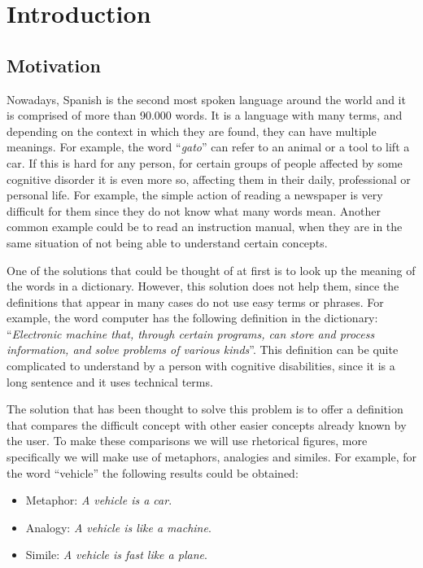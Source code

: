 \chapter{Introduction}
\label{cap:introduction}

\section{Motivation}
\label{sec:motivation}

Nowadays, Spanish is the second most spoken language around the world and it is comprised of more than 90.000 words. It is a language with many terms, and depending on the context in which they are found, they can have multiple meanings. For example, the word ``\textit{gato}'' can refer to an animal or a tool to lift a car. If this is hard for any person, for certain groups of people affected by some cognitive disorder it is even more so, affecting them in their daily, professional or personal life. For example, the simple action of reading a newspaper is very difficult for them since they do not know what many words mean. Another common example could be to read an instruction manual, when they are in the same situation of not being able to understand certain concepts.


One of the solutions that could be thought of at first is to look up the meaning of the words in a dictionary. However, this solution does not help them, since the definitions that appear in many cases do not use easy terms or phrases. For example, the word computer has the following definition in the dictionary: ``\textit{Electronic machine that, through certain programs, can store and process information, and solve problems of various kinds}''. This definition can be quite complicated to understand by a person with cognitive disabilities, since it is a long sentence and it uses technical terms.


The solution that has been thought to solve this problem is to offer a definition that compares the difficult concept with other easier concepts already known by the user. To make these comparisons we will use rhetorical figures, more specifically we will make use of metaphors, analogies and similes. For example, for the word ``vehicle'' the following results could be obtained:

\begin{itemize}
	\item Metaphor: \textit{A vehicle is a car}.
	\item Analogy: \textit{A vehicle is like a machine}.
	\item Simile: \textit{A vehicle is fast like a plane}.
\end{itemize}

